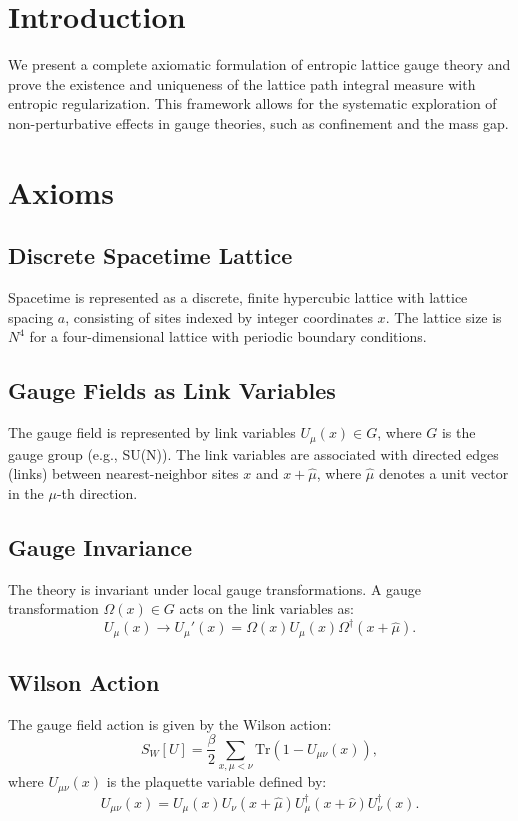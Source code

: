 \section*{Introduction}

We present a complete axiomatic formulation of entropic lattice gauge theory 
and prove the existence and uniqueness of the lattice path integral measure with 
entropic regularization. This framework allows for the systematic exploration 
of non-perturbative effects in gauge theories, such as confinement and the mass 
gap.

\section{Axioms}

\subsection{Discrete Spacetime Lattice}  
Spacetime is represented as a discrete, finite hypercubic lattice with lattice spacing \(a\), consisting of sites indexed by integer coordinates \(x\). The lattice size is \(N^4\) for a four-dimensional lattice with periodic boundary conditions.

\subsection{Gauge Fields as Link Variables}  
The gauge field is represented by link variables \(U_\mu(x) \in G\), where \(G\) is the gauge group (e.g., SU(N)). The link variables are associated with directed edges (links) between nearest-neighbor sites \(x\) and \(x + \hat{\mu}\), where \(\hat{\mu}\) denotes a unit vector in the \(\mu\)-th direction.

\subsection{Gauge Invariance}  
The theory is invariant under local gauge transformations. A gauge transformation \(\Omega(x) \in G\) acts on the link variables as:
\begin{equation}
U_\mu(x) \rightarrow U_\mu'(x) = \Omega(x) U_\mu(x) \Omega^\dagger(x + \hat{\mu}).
\end{equation}

\subsection{Wilson Action}  
The gauge field action is given by the Wilson action:
\begin{equation}
S_W[U] = \frac{\beta}{2} \sum_{x, \mu < \nu} \text{Tr}\left(1 - U_{\mu\nu}(x)\right),
\end{equation}
where \(U_{\mu\nu}(x)\) is the plaquette variable defined by:
\begin{equation}
U_{\mu\nu}(x) = U_\mu(x) U_\nu(x + \hat{\mu}) U_\mu^\dagger(x + \hat{\nu}) U_\nu^\dagger(x).
\end{equation}


